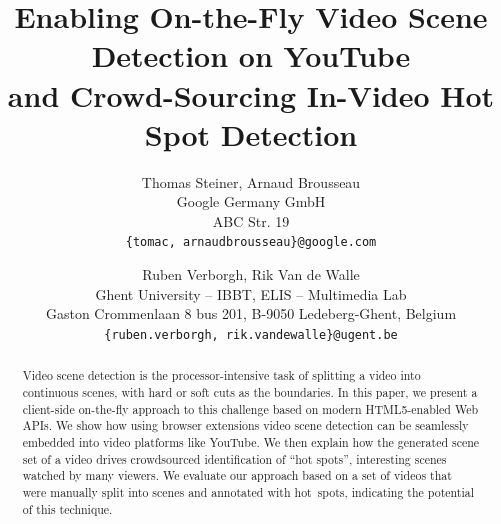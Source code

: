\documentclass[10pt,twocolumn,letterpaper]{article}
\begin{document}
\title{Enabling On-the-Fly Video Scene Detection on YouTube\\ and Crowd-Sourcing In-Video Hot Spot Detection}

\author{Thomas Steiner, Arnaud Brousseau\\
Google Germany GmbH\\
ABC Str. 19\\
{\tt\small \{tomac, arnaudbrousseau\}@google.com}
\and
Ruben Verborgh, Rik Van de Walle \\
Ghent University -- IBBT, ELIS -- Multimedia Lab\\
Gaston Crommenlaan 8 bus 201, B-9050 Ledeberg-Ghent, Belgium\\
{\tt\small \{ruben.verborgh, rik.vandewalle\}@ugent.be}
}

\maketitle

\begin{abstract}
Video scene detection is the processor-intensive task of splitting a video into continuous scenes, with hard or soft cuts as the boundaries. In this paper, we present a client-side on-the-fly approach to this challenge based on modern HTML5-enabled Web APIs. We show how using browser extensions video scene detection can be seamlessly embedded into video platforms like YouTube.
We then explain how the generated scene set of a video drives crowdsourced identification of ``hot spots'', interesting scenes watched by many viewers. We evaluate our approach based on a set of videos that were manually split into scenes and annotated with hot~spots, indicating the potential of this technique.
\end{abstract}

\end{document}
